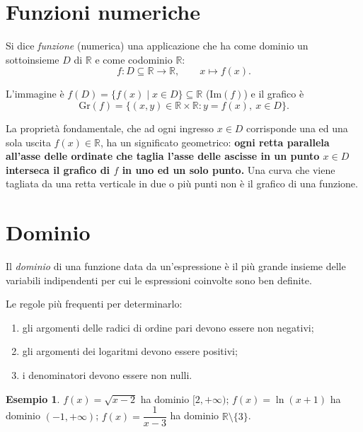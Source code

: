 \documentclass[11pt,a4paper]{article}
\theoremstyle{definition}
\newtheorem*{esempio}{Esempio}
\begin{document}
\section{Funzioni numeriche}

\begin{definizione}
Si dice \emph{funzione} (numerica) una applicazione che ha come dominio un sottoinsieme $D$ di $\mathbb{R}$ e come codominio $\mathbb{R}$:
\[
f : D \subseteq \mathbb{R} \to \mathbb{R}, \qquad x \mapsto f(x).
\]
\end{definizione}

L'immagine è $f(D) = \{f(x) \mid x \in D\} \subseteq \mathbb{R}$ ($\mathrm{Im}(f)$) e il grafico è
\[
\mathrm{Gr}(f) = \{(x, y) \in \mathbb{R} \times \mathbb{R} : y = f(x),\ x \in D\}.
\]

La proprietà fondamentale, che ad ogni ingresso $x \in D$ corrisponde una ed una sola uscita $f(x) \in \mathbb{R}$, ha un significato geometrico: \textbf{ogni retta parallela all'asse delle ordinate che taglia l'asse delle ascisse in un punto $x \in D$ interseca il grafico di $f$ in uno ed un solo punto.} Una curva che viene tagliata da una retta verticale in due o più punti non è il grafico di una funzione.

\section{Dominio}

\begin{definizione}
Il \emph{dominio} di una funzione data da un'espressione è il più grande insieme delle variabili indipendenti per cui le espressioni coinvolte sono ben definite.
\end{definizione}

Le regole più frequenti per determinarlo:
\begin{enumerate}
    \item gli argomenti delle radici di ordine pari devono essere non negativi;
    \item gli argomenti dei logaritmi devono essere positivi;
    \item i denominatori devono essere non nulli.
\end{enumerate}

\begin{esempio}
$f(x) = \sqrt{x - 2}$ ha dominio $[2, +\infty)$; $f(x) = \ln(x + 1)$ ha dominio $(-1, +\infty)$; $f(x) = \dfrac{1}{x - 3}$ ha dominio $\mathbb{R} \setminus \{3\}$.
\end{esempio}
\end{document}

